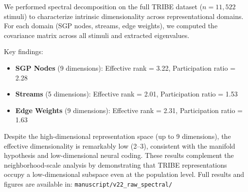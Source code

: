We performed spectral decomposition on the full TRIBE dataset ($n = 11,522$ stimuli) to characterize intrinsic dimensionality across representational domains. For each domain (SGP nodes, streams, edge weights), we computed the covariance matrix across all stimuli and extracted eigenvalues.

Key findings:

\begin{itemize}
	\item \textbf{SGP Nodes} (9 dimensions): Effective rank = 3.22, Participation ratio = 2.28
	\item \textbf{Streams} (5 dimensions): Effective rank = 2.01, Participation ratio = 1.53
	\item \textbf{Edge Weights} (9 dimensions): Effective rank = 2.31, Participation ratio = 1.63
\end{itemize}

Despite the high-dimensional representation space (up to 9 dimensions), the effective dimensionality is remarkably low (2--3), consistent with the manifold hypothesis and low-dimensional neural coding. These results complement the neighborhood-scale analysis by demonstrating that TRIBE representations occupy a low-dimensional subspace even at the population level. Full results and figures are available in: \texttt{manuscript/v22\_raw\_spectral/}

